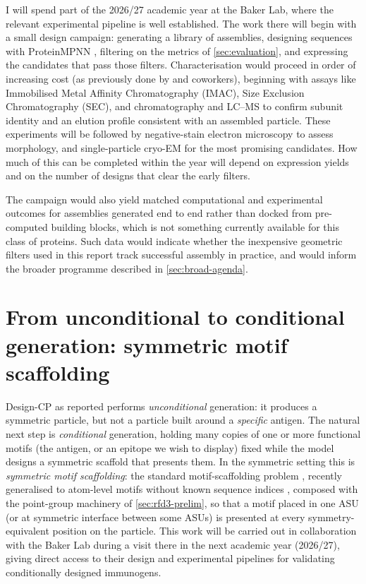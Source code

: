 I will spend part of the 2026/27 academic year at the Baker Lab, where the relevant
experimental pipeline is well established. The work there will begin with a
small design campaign: generating a library of assemblies, designing sequences
with ProteinMPNN \parencite{dauparasRobustDeepLearning2022}, filtering on the
metrics of \cref{sec:evaluation}, and expressing the candidates that
pass those filters. Characterisation would proceed in order of increasing cost (as previously done by \textcite{haas_novo_2026} and coworkers), beginning
with assays like Immobilised Metal Affinity Chromatography (IMAC), Size Exclusion Chromatography (SEC), and chromatography and LC--MS to confirm subunit identity and an elution profile consistent with an assembled particle. These experiments will be followed by negative-stain
electron microscopy to assess morphology, and single-particle cryo-EM for the
most promising candidates. How much of this can be completed within the year
will depend on expression yields and on the number of designs that clear the
early filters.

The campaign would also yield matched computational and experimental outcomes
for assemblies generated end to end rather than docked from pre-computed
building blocks, which is not something currently available for this class of
proteins. Such data would indicate whether the inexpensive geometric filters used
in this report track successful assembly in practice, and would inform the
broader programme described in \cref{sec:broad-agenda}.


\section{From unconditional to conditional generation: symmetric motif scaffolding}
\label{sec:motif-scaffolding}

Design-CP as reported performs \emph{unconditional} generation: it produces a
symmetric particle, but not a particle built around a \emph{specific} antigen. The
natural next step is \emph{conditional} generation, holding many copies of one or more functional
motifs (the antigen, or an epitope we wish to display) fixed while the model
designs a symmetric scaffold that presents them. In the symmetric setting this is
\emph{symmetric motif scaffolding}: the standard motif-scaffolding problem
\parencite{watsonNovoDesignProtein2023,didiFrameworkConditionalDiffusion2024},
recently generalised to atom-level motifs without known sequence indices
\parencite{ahern_atom_2025}, composed with the
point-group machinery of \cref{sec:rfd3-prelim}, so that a motif placed in
one ASU (or at symmetric interface between some ASUs) is presented at every symmetry-equivalent 
position on the particle. This work will be
carried out in collaboration with the Baker Lab during a visit there in the next
academic year (2026/27), giving direct access to their design and experimental
pipelines for validating conditionally designed immunogens.

